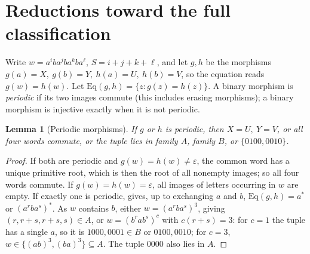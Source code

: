 \documentclass[10pt]{article}
\newtheorem{lemma}[theorem]{Lemma}
\newcommand{\eps}{\varepsilon}
\theoremstyle{remark}\newtheorem*{remark}{Remark}
\begin{document}
\section{Reductions toward the full classification}
Write \(w=a^iba^jba^kba^\ell\), \(S=i+j+k+\ell\), and let \(g,h\) be the morphisms \(g(a)=X,\ g(b)=Y,\ h(a)=U,\ h(b)=V\), so the equation reads \(g(w)=h(w)\). Let \(\mathrm{Eq}(g,h)=\{z: g(z)=h(z)\}\). A binary morphism is \emph{periodic} if its two images commute (this includes erasing morphisms); a binary morphism is injective exactly when it is not periodic.

\begin{lemma}[Periodic morphisms]\label{perred}
If \(g\) or \(h\) is periodic, then \(X=U,\ Y=V\), or all four words commute, or the tuple lies in family \(A\), family \(B\), or \(\{0100,0010\}\).
\end{lemma}
\begin{proof}
If both are periodic and \(g(w)=h(w)\ne\eps\), the common word has a unique primitive root, which is then the root of all nonempty images; so all four words commute. If \(g(w)=h(w)=\eps\), all images of letters occurring in \(w\) are empty. If exactly one is periodic, \cite[Theorem 1]{periodic} gives, up to exchanging \(a\) and \(b\), \(\mathrm{Eq}(g,h)=a^*\) or \((a^rba^s)^*\). As \(w\) contains \(b\), either \(w=(a^rba^s)^3\), giving \((r,r+s,r+s,s)\in A\), or \(w=(b^rab^s)^c\) with \(c(r+s)=3\): for \(c=1\) the tuple has a single \(a\), so it is \(1000,0001\in B\) or \(0100,0010\); for \(c=3\), \(w\in\{(ab)^3,(ba)^3\}\subseteq A\). The tuple \(0000\) also lies in \(A\).
\end{proof}
\end{document}
